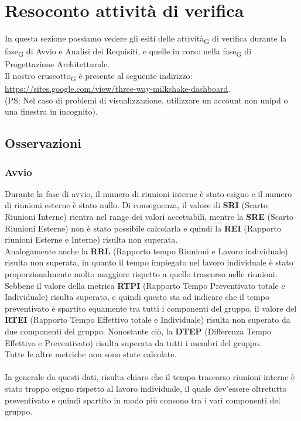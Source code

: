 
\section{Resoconto {attività} di verifica}
In questa sezione possiamo vedere gli esiti delle attività\textsubscript{G} di verifica durante la fase\textsubscript{G} di Avvio e Analisi dei Requisiti, e quelle in corso nella fase\textsubscript{G} di Progettazione Architetturale.\\
Il nostro cruscotto\textsubscript{G} è presente al seguente indirizzo:\\ \url{https://sites.google.com/view/three-way-milkshake-dashboard}.\\ (PS: Nel caso di problemi di visualizzazione, utilizzare un account non unipd o una finestra in incognito).
\subsection{Osservazioni}
\subsubsection{Avvio}
Durante la fase di avvio, il numero di riunioni interne è stato esiguo e il numero di riunioni esterne è stato nullo. Di conseguenza, il valore di \textbf{SRI} (Scarto Riunioni Interne) rientra nel range dei valori accettabili, mentre la \textbf{SRE} (Scarto Riunioni Esterne) non è stato possibile calcolarla e quindi la \textbf{REI} (Rapporto riunioni Esterne e Interne) risulta non superata. \\
Analogamente anche la \textbf{RRL} (Rapporto tempo Riunioni e Lavoro individuale) risulta non superata, in quanto il tempo impiegato nel lavoro individuale è stato proporzionalmente molto maggiore rispetto a quello trascorso nelle riunioni. \\
Sebbene il valore della metrica \textbf{RTPI} (Rapporto Tempo Preventivato totale e Individuale) risulta superato, e quindi questo sta ad indicare che il tempo preventivato è spartito equamente tra tutti i componenti del gruppo, il valore del \textbf{RTEI} (Rapporto Tempo Effettivo totale e Individuale) risulta non superato da due componenti del gruppo. Nonostante ciò, la \textbf{DTEP} (Differenza Tempo Effettivo e Preventivato) risulta superata da tutti i membri del gruppo.\\
Tutte le altre metriche non sono state calcolate.\\\\
In generale da questi dati, risulta chiaro che il tempo trascorso riunioni interne è stato troppo esiguo rispetto al lavoro individuale, il quale dev'essere oltretutto preventivato e quindi spartito in modo più consono tra i vari componenti del gruppo.

